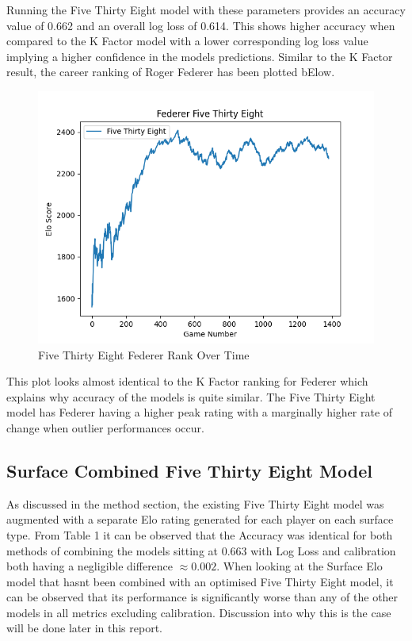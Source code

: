 \documentclass[12pt,a4paper]{article}
\begin{document}
Running the Five Thirty Eight model with these parameters provides an accuracy value of
0.662 and an overall log loss of 0.614. This shows higher accuracy when compared
to the K Factor model
with a lower corresponding log loss value implying a higher confidence in the models predictions.
Similar to the K Factor result, the career ranking of Roger Federer has been plotted bElow.

\begin{figure}[H]
  \centering
  \includegraphics[scale=0.8]{images/federer_538.png}
  \caption{Five Thirty Eight Federer Rank Over Time}
  \label{fig:federer-538}
\end{figure}

This plot looks almost identical to the K Factor ranking for Federer which explains why
accuracy of the models is quite similar. The Five Thirty Eight model has Federer having a
higher peak rating with a marginally higher rate of change when outlier performances occur.

\subsection{Surface Combined Five Thirty Eight Model}
As discussed in the method section, the existing Five Thirty Eight model was augmented
with a separate Elo rating generated for each player on each surface type. From Table 1
it can be observed that the Accuracy was identical for both methods of combining the models
sitting at $0.663$ with Log Loss and calibration both having a negligible difference
$\approx 0.002$. When looking at the Surface Elo model that hasnt been combined with an
optimised Five Thirty Eight model, it can be observed that its performance is significantly
worse than any of the other models in all metrics excluding calibration. Discussion into why
this is the case will be done later in this report.
\end{document}
